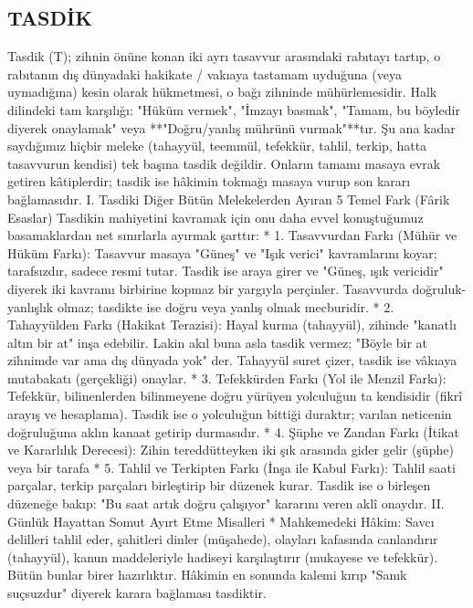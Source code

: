 \documentclass[11pt,a4paper]{article}
\begin{document}
\subsection{TASDİK}


Tasdik (T); zihnin önüne konan iki ayrı tasavvur arasındaki rabıtayı tartıp, o rabıtanın dış dünyadaki hakikate / vakıaya tastamam uyduğuna (veya uymadığına) kesin olarak hükmetmesi, o bağı zihninde mühürlemesidir.
Halk dilindeki tam karşılığı: "Hüküm vermek", "İmzayı basmak", "Tamam, bu böyledir diyerek onaylamak" veya **"Doğru/yanlış mührünü vurmak"**tır.
Şu ana kadar saydığımız hiçbir meleke (tahayyül, teemmül, tefekkür, tahlil, terkip, hatta tasavvurun kendisi) tek başına tasdik değildir. Onların tamamı masaya evrak getiren kâtiplerdir; tasdik ise hâkimin tokmağı masaya vurup son kararı bağlamasıdır.
I. Tasdiki Diğer Bütün Melekelerden Ayıran 5 Temel Fark (Fârik Esaslar)
Tasdikin mahiyetini kavramak için onu daha evvel konuştuğumuz basamaklardan net sınırlarla ayırmak şarttır:
 * 1. Tasavvurdan Farkı (Mühür ve Hüküm Farkı):
   Tasavvur masaya "Güneş" ve "Işık verici" kavramlarını koyar; tarafsızdır, sadece resmi tutar. Tasdik ise araya girer ve "Güneş, ışık vericidir" diyerek iki kavramı birbirine kopmaz bir yargıyla perçinler. Tasavvurda doğruluk-yanlışlık olmaz; tasdikte ise doğru veya yanlış olmak mecburidir.
 * 2. Tahayyülden Farkı (Hakikat Terazisi):
   Hayal kurma (tahayyül), zihinde "kanatlı altın bir at" inşa edebilir. Lakin akıl buna asla tasdik vermez; "Böyle bir at zihnimde var ama dış dünyada yok" der. Tahayyül suret çizer, tasdik ise vâkıaya mutabakatı (gerçekliği) onaylar.
 * 3. Tefekkürden Farkı (Yol ile Menzil Farkı):
   Tefekkür, bilinenlerden bilinmeyene doğru yürüyen yolculuğun ta kendisidir (fikrî arayış ve hesaplama). Tasdik ise o yolculuğun bittiği duraktır; varılan neticenin doğruluğuna aklın kanaat getirip durmasıdır.
 * 4. Şüphe ve Zandan Farkı (İtikat ve Kararlılık Derecesi):
   Zihin tereddütteyken iki şık arasında gider gelir (şüphe) veya bir tarafa %
 * 5. Tahlil ve Terkipten Farkı (İnşa ile Kabul Farkı):
   Tahlil saati parçalar, terkip parçaları birleştirip bir düzenek kurar. Tasdik ise o birleşen düzeneğe bakıp: "Bu saat artık doğru çalışıyor" kararını veren aklî onaydır.
II. Günlük Hayattan Somut Ayırt Etme Misalleri
 * Mahkemedeki Hâkim: Savcı delilleri tahlil eder, şahitleri dinler (müşahede), olayları kafasında canlandırır (tahayyül), kanun maddeleriyle hadiseyi karşılaştırır (mukayese ve tefekkür). Bütün bunlar birer hazırlıktır. Hâkimin en sonunda kalemi kırıp "Sanık suçsuzdur" diyerek karara bağlaması tasdiktir.
\end{document}
